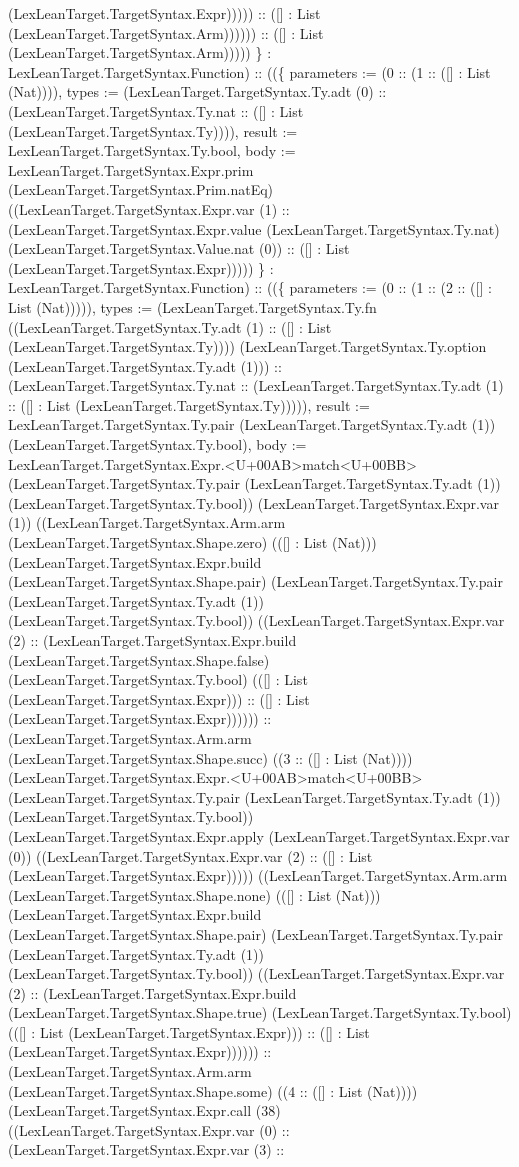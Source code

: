 \documentclass[11pt]{article}
\begin{document}
(LexLeanTarget.TargetSyntax.Expr))))) :: ([] : List (LexLeanTarget.TargetSyntax.Arm)))))) :: ([] : List (LexLeanTarget.TargetSyntax.Arm))))) \} : LexLeanTarget.TargetSyntax.Function) :: ((\{ parameters := (0 :: (1 :: ([] : List (Nat)))), types := (LexLeanTarget.TargetSyntax.Ty.adt (0) :: (LexLeanTarget.TargetSyntax.Ty.nat :: ([] : List (LexLeanTarget.TargetSyntax.Ty)))), result := LexLeanTarget.TargetSyntax.Ty.bool, body := LexLeanTarget.TargetSyntax.Expr.prim (LexLeanTarget.TargetSyntax.Prim.natEq) ((LexLeanTarget.TargetSyntax.Expr.var (1) :: (LexLeanTarget.TargetSyntax.Expr.value (LexLeanTarget.TargetSyntax.Ty.nat) (LexLeanTarget.TargetSyntax.Value.nat (0)) :: ([] : List (LexLeanTarget.TargetSyntax.Expr))))) \} : LexLeanTarget.TargetSyntax.Function) :: ((\{ parameters := (0 :: (1 :: (2 :: ([] : List (Nat))))), types := (LexLeanTarget.TargetSyntax.Ty.fn ((LexLeanTarget.TargetSyntax.Ty.adt (1) :: ([] : List (LexLeanTarget.TargetSyntax.Ty)))) (LexLeanTarget.TargetSyntax.Ty.option (LexLeanTarget.TargetSyntax.Ty.adt (1))) :: (LexLeanTarget.TargetSyntax.Ty.nat :: (LexLeanTarget.TargetSyntax.Ty.adt (1) :: ([] : List (LexLeanTarget.TargetSyntax.Ty))))), result := LexLeanTarget.TargetSyntax.Ty.pair (LexLeanTarget.TargetSyntax.Ty.adt (1)) (LexLeanTarget.TargetSyntax.Ty.bool), body := LexLeanTarget.TargetSyntax.Expr.<U+00AB>match<U+00BB> (LexLeanTarget.TargetSyntax.Ty.pair (LexLeanTarget.TargetSyntax.Ty.adt (1)) (LexLeanTarget.TargetSyntax.Ty.bool)) (LexLeanTarget.TargetSyntax.Expr.var (1)) ((LexLeanTarget.TargetSyntax.Arm.arm (LexLeanTarget.TargetSyntax.Shape.zero) (([] : List (Nat))) (LexLeanTarget.TargetSyntax.Expr.build (LexLeanTarget.TargetSyntax.Shape.pair) (LexLeanTarget.TargetSyntax.Ty.pair (LexLeanTarget.TargetSyntax.Ty.adt (1)) (LexLeanTarget.TargetSyntax.Ty.bool)) ((LexLeanTarget.TargetSyntax.Expr.var (2) :: (LexLeanTarget.TargetSyntax.Expr.build (LexLeanTarget.TargetSyntax.Shape.false) (LexLeanTarget.TargetSyntax.Ty.bool) (([] : List (LexLeanTarget.TargetSyntax.Expr))) :: ([] : List (LexLeanTarget.TargetSyntax.Expr)))))) :: (LexLeanTarget.TargetSyntax.Arm.arm (LexLeanTarget.TargetSyntax.Shape.succ) ((3 :: ([] : List (Nat)))) (LexLeanTarget.TargetSyntax.Expr.<U+00AB>match<U+00BB> (LexLeanTarget.TargetSyntax.Ty.pair (LexLeanTarget.TargetSyntax.Ty.adt (1)) (LexLeanTarget.TargetSyntax.Ty.bool)) (LexLeanTarget.TargetSyntax.Expr.apply (LexLeanTarget.TargetSyntax.Expr.var (0)) ((LexLeanTarget.TargetSyntax.Expr.var (2) :: ([] : List (LexLeanTarget.TargetSyntax.Expr))))) ((LexLeanTarget.TargetSyntax.Arm.arm (LexLeanTarget.TargetSyntax.Shape.none) (([] : List (Nat))) (LexLeanTarget.TargetSyntax.Expr.build (LexLeanTarget.TargetSyntax.Shape.pair) (LexLeanTarget.TargetSyntax.Ty.pair (LexLeanTarget.TargetSyntax.Ty.adt (1)) (LexLeanTarget.TargetSyntax.Ty.bool)) ((LexLeanTarget.TargetSyntax.Expr.var (2) :: (LexLeanTarget.TargetSyntax.Expr.build (LexLeanTarget.TargetSyntax.Shape.true) (LexLeanTarget.TargetSyntax.Ty.bool) (([] : List (LexLeanTarget.TargetSyntax.Expr))) :: ([] : List (LexLeanTarget.TargetSyntax.Expr)))))) :: (LexLeanTarget.TargetSyntax.Arm.arm (LexLeanTarget.TargetSyntax.Shape.some) ((4 :: ([] : List (Nat)))) (LexLeanTarget.TargetSyntax.Expr.call (38) ((LexLeanTarget.TargetSyntax.Expr.var (0) :: (LexLeanTarget.TargetSyntax.Expr.var (3) :: 
\end{document}
